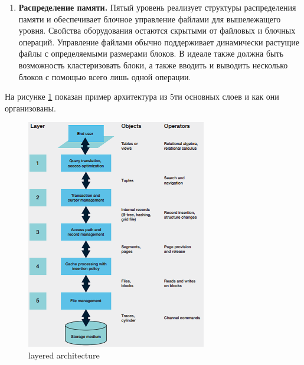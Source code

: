 \documentclass{article}
\begin{document}
\begin{enumerate}
    \item \textbf{Распределение памяти.} Пятый уровень реализует структуры распределения памяти и обеспечивает блочное управление файлами для вышележащего уровня. Свойства оборудования остаются скрытыми от файловых и блочных операций. Управление файлами обычно поддерживает динамически растущие файлы с определяемыми размерами блоков. В идеале также должна быть возможность кластеризовать блоки, а также вводить и выводить несколько блоков с помощью всего лишь одной операции.
\end{enumerate}
На рисунке \ref{img10} показан пример архитектура из 5ти основных слоев и как они организованы.
\begin{figure}[ht]
    \centering
    \includegraphics[width=0.7\textwidth]{images/layers.png}
    \caption{layered architecture}
    \label{img10}
\end{figure}
\end{document}
